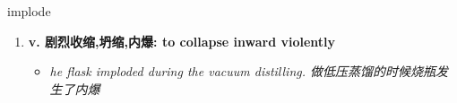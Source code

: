 
\begin{frame}
{\huge implode}
\begin{center}
\begin{enumerate}\Large
  \item \textbf{v. 剧烈收缩,坍缩,内爆: to collapse inward violently}
  \begin{itemize}
    \item \em{\Large{he flask imploded during the vacuum distilling. 做低压蒸馏的时候烧瓶发生了内爆}}
  \end{itemize}
\end{enumerate}
\end{center}
\end{frame}
